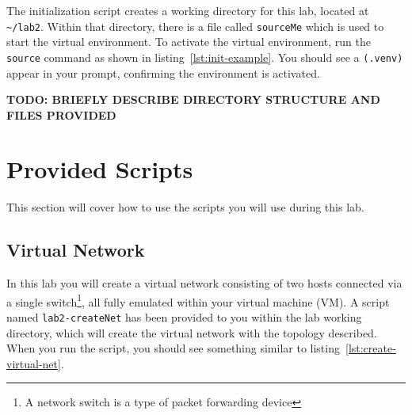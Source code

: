 \documentclass[11pt]{article}
\def\thelab{2}
\begin{document}
The initialization script creates a working directory for this lab, located at \texttt{\textasciitilde/lab\thelab}.
Within that directory, there is a file called \texttt{sourceMe} which is used to start the virtual environment.
To activate the virtual environment, run the \texttt{source} command as shown in listing~\ref{lst:init-example}.
You should see a \texttt{(.venv)} appear in your prompt, confirming the environment is activated.


\textbf{TODO: BRIEFLY DESCRIBE DIRECTORY STRUCTURE AND FILES PROVIDED}


\section{Provided Scripts}
\label{sec:provided-scripts}
This section will cover how to use the scripts you will use during this lab.

\subsection{Virtual Network}
In this lab you will create a virtual network consisting of two hosts connected via a single switch\footnote{A network switch is a type of packet forwarding device}, all fully emulated within your virtual machine (VM).
A script named \texttt{lab2-createNet} has been provided to you within the lab working directory, which will create the virtual network with the topology described.
When you run the script, you should see something similar to listing~\ref{lst:create-virtual-net}.
\end{document}
